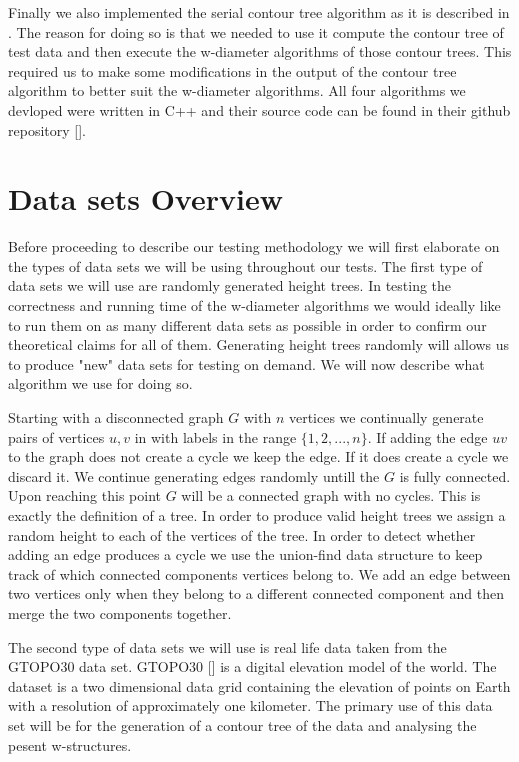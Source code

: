 Finally we also implemented the serial contour tree algorithm as it is described in \cite{ct-big-paper}. The reason for doing so is that we needed to use it compute the contour tree of test data and then execute the w-diameter algorithms of those contour trees. This required us to make some modifications in the output of the contour tree algorithm to better suit the w-diameter algorithms. All four algorithms we devloped were written in C++ and their source code can be found in their github repository [].

\section{Data sets Overview}

Before proceeding to describe our testing methodology we will first elaborate on the types of data sets we will be using throughout our tests. The first type of data sets we will use are randomly generated height trees. In testing the correctness and running time of the w-diameter algorithms we would ideally like to run them on as many different data sets as possible in order to confirm our theoretical claims for all of them. Generating height trees randomly will allows us to produce "new" data sets for testing on demand. We will now describe what algorithm we use for doing so.

Starting with a disconnected graph $G$ with $n$ vertices we continually generate pairs of vertices $u, v$ in with labels in the range $\{1, 2, ..., n\}$. If adding the edge $uv$ to the graph does not create a cycle we keep the edge. If it does create a cycle we discard it. We continue generating edges randomly untill the $G$ is fully connected. Upon reaching this point $G$ will be a connected graph with no cycles. This is exactly the definition of a tree. In order to produce valid height trees we assign a random height to each of the vertices of the tree. In order to detect  whether adding an edge produces a cycle we use the union-find data structure to keep track of which connected components vertices belong to. We add an edge between two vertices only when they belong to a different connected component and then merge the two components together.

The second type of data sets we will use is real life data taken from the GTOPO30 data set. GTOPO30 [] is a digital elevation model of the world. The dataset is a two dimensional data grid containing the elevation of points on Earth with a resolution of approximately one kilometer. The primary use of this data set will be for the generation of a contour tree of the data and analysing the pesent w-structures.

